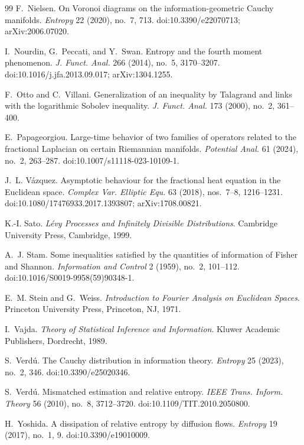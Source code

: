 \documentclass[11pt,reqno]{amsart}
\theoremstyle{plain}
\theoremstyle{definition}
\numberwithin{equation}{section}
\begin{document}
\begin{thebibliography}{99}
F.~Nielsen.
\newblock On Voronoi diagrams on the information-geometric Cauchy manifolds.
\newblock \emph{Entropy} 22 (2020), no.~7, 713.
\newblock doi:10.3390/e22070713; arXiv:2006.07020.

I.~Nourdin, G.~Peccati, and Y.~Swan.
\newblock Entropy and the fourth moment phenomenon.
\newblock \emph{J. Funct. Anal.} 266 (2014), no.~5, 3170--3207.
\newblock doi:10.1016/j.jfa.2013.09.017; arXiv:1304.1255.

F.~Otto and C.~Villani.
\newblock Generalization of an inequality by Talagrand and links with the
logarithmic Sobolev inequality.
\newblock \emph{J. Funct. Anal.} 173 (2000), no.~2, 361--400.

E.~Papageorgiou.
\newblock Large-time behavior of two families of operators related to the
fractional Laplacian on certain Riemannian manifolds.
\newblock \emph{Potential Anal.} 61 (2024), no.~2, 263--287.
\newblock doi:10.1007/s11118-023-10109-1.

J.~L. V\'azquez.
\newblock Asymptotic behaviour for the fractional heat equation in the
Euclidean space.
\newblock \emph{Complex Var. Elliptic Equ.} 63 (2018), nos.~7--8,
1216--1231.
\newblock doi:10.1080/17476933.2017.1393807; arXiv:1708.00821.

K.-I. Sato.
\newblock \emph{L{\'e}vy Processes and Infinitely Divisible Distributions}.
\newblock Cambridge University Press, Cambridge, 1999.

A.~J. Stam.
\newblock Some inequalities satisfied by the quantities of information of
Fisher and Shannon.
\newblock \emph{Information and Control} 2 (1959), no.~2, 101--112.
\newblock doi:10.1016/S0019-9958(59)90348-1.

E.~M. Stein and G.~Weiss.
\newblock \emph{Introduction to Fourier Analysis on Euclidean Spaces}.
\newblock Princeton University Press, Princeton, NJ, 1971.

I.~Vajda.
\newblock \emph{Theory of Statistical Inference and Information}.
\newblock Kluwer Academic Publishers, Dordrecht, 1989.

S.~Verd{\'u}.
\newblock The Cauchy distribution in information theory.
\newblock \emph{Entropy} 25 (2023), no.~2, 346.
\newblock doi:10.3390/e25020346.

S.~Verd{\'u}.
\newblock Mismatched estimation and relative entropy.
\newblock \emph{IEEE Trans. Inform. Theory} 56 (2010), no.~8, 3712--3720.
\newblock doi:10.1109/TIT.2010.2050800.

H.~Yoshida.
\newblock A dissipation of relative entropy by diffusion flows.
\newblock \emph{Entropy} 19 (2017), no.~1, 9.
\newblock doi:10.3390/e19010009.

\end{thebibliography}
\end{document}
